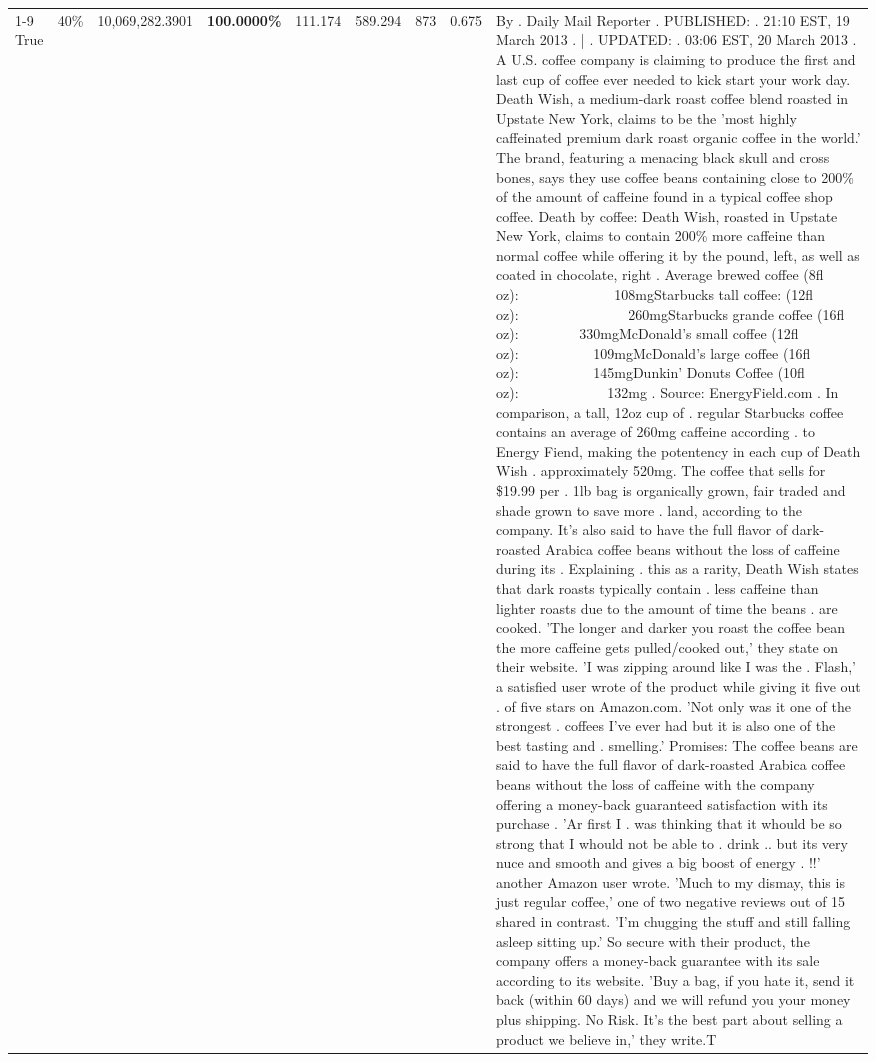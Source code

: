 \begin{table}[H]
{\begin{tabular}{lllrlllll}
\cline{1-9} \cline{2-9}
True & 40\% & 10,069,282.3901 & \bfseries \color{red} 100.0000\% & 111.174 & 589.294 & 873 & 0.675 & By . Daily Mail Reporter . PUBLISHED: . 21:10 EST, 19 March 2013 . | . UPDATED: . 03:06 EST, 20 March 2013 . A U.S. coffee company is claiming to produce the first and last cup of coffee ever needed to kick start your work day. Death Wish, a medium-dark roast coffee blend roasted in Upstate New York, claims to be the 'most highly caffeinated premium dark roast organic coffee in the world.' The brand, featuring a menacing black skull and cross bones, says they use coffee beans containing close to 200\% of the amount of caffeine found in a typical coffee shop coffee. Death by coffee: Death Wish, roasted in Upstate New York, claims to contain 200\% more caffeine than normal coffee while offering it by the pound, left, as well as coated in chocolate, right . Average brewed coffee (8fl oz):              108mgStarbucks tall coffee: (12fl oz):                260mgStarbucks grande coffee (16fl oz):         330mgMcDonald's small coffee (12fl oz):           109mgMcDonald's large coffee (16fl oz):           145mgDunkin' Donuts Coffee (10fl oz):             132mg . Source: EnergyField.com . In comparison, a tall, 12oz cup of . regular Starbucks coffee contains an average of 260mg caffeine according . to Energy Fiend, making the potentency in each cup of Death Wish . approximately 520mg. The coffee that sells for \$19.99 per . 1lb bag is organically grown, fair traded and shade grown to save more . land, according to the company. It's also said to have the full flavor of dark-roasted Arabica coffee beans without the loss of caffeine during its . Explaining . this as a rarity, Death Wish states that dark roasts typically contain . less caffeine than lighter roasts due to the amount of time the beans . are cooked. 'The longer and darker you roast the coffee bean the more caffeine gets pulled/cooked out,' they state on their website. 'I was zipping around like I was the . Flash,' a satisfied user wrote of the product while giving it five out . of five stars on Amazon.com. 'Not only was it one of the strongest . coffees I've ever had but it is also one of the best tasting and . smelling.’ Promises: The coffee beans are said to have the full flavor of dark-roasted Arabica coffee beans without the loss of caffeine with the company offering a money-back guaranteed satisfaction with its purchase . 'Ar first I . was thinking that it whould be so strong that I whould not be able to . drink .. but its very nuce and smooth and gives a big boost of energy . !!' another Amazon user wrote. 'Much to my dismay, this is just regular coffee,' one of two negative reviews out of 15 shared in contrast. 'I'm chugging the stuff and still falling asleep sitting up.' So secure with their product, the company offers a money-back guarantee with its sale according to its website. 'Buy a bag, if you hate it, send it back (within 60 days) and we will refund you your money plus shipping. No Risk. It’s the best part about selling a product we believe in,' they write.T \\

\end{tabular}}
\end{table}

